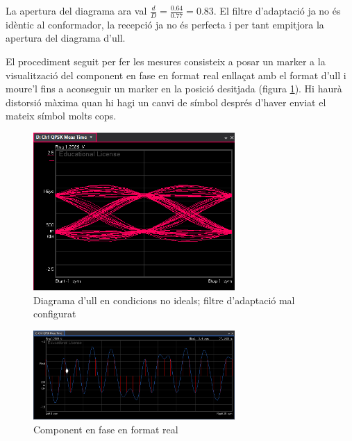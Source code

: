 \documentclass[catalan, a4paper, nobib]{tufte-handout}
\begin{document}
\newpage


La apertura del diagrama ara val $\frac{d}{D}=\frac{\num{0.64}}{\num{0.77}}=\num{0.83}$. El filtre d'adaptació ja no és idèntic al conformador, la recepció ja no és perfecta i per tant empitjora la apertura del diagrama d'ull.

El procediment seguit per fer les mesures consisteix a posar un marker a la visualització del component en fase en format real enllaçat amb el format d'ull i moure'l fins a aconseguir un marker en la posició desitjada (figura \ref{fig:MARKER}). Hi haurà distorsió màxima quan hi hagi un canvi de símbol després d'haver enviat el mateix símbol molts cops.

\begin{figure}[!h]
    \begin{center}
        \includegraphics[width=290px]{p5.png}
    \end{center}
    \caption{Diagrama d'ull en condicions no ideals; filtre d'adaptació mal configurat}
\end{figure}

\begin{figure}
    \begin{center}
        \includegraphics[width=290px]{p5_2.png}
    \end{center}
    \caption{Component en fase en format real}
    \label{fig:MARKER}
\end{figure}

\newpage

\end{document}
